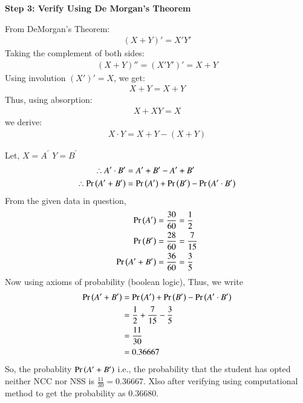 \documentclass[journal]{IEEEtran}
\begin{document}
\textbf{Step 3: Verify Using De Morgan’s Theorem}

From DeMorgan’s Theorem:
\begin{align}
(X + Y)' = X' Y'
\end{align}
Taking the complement of both sides:
\begin{align}
(X + Y)'' = (X' Y')' = X + Y
\end{align}
Using involution \( (X')' = X \), we get:
\begin{align}
X + Y = X + Y
\end{align}
Thus, using absorption:
\begin{align}
X + XY = X
\end{align}
we derive:
\begin{align}
X \cdot Y = X + Y - (X + Y)
\end{align}

Let, $X = A^\prime$ $Y = B^\prime $
\begin{align}
    \therefore  {A^\prime \cdot B^\prime} &= {A^\prime} + {B^\prime} - {A^\prime + B^\prime} \\
    \therefore  \Pr\left(A^\prime + B^\prime\right) &= \Pr\left(A^\prime\right) + \Pr\left(B^\prime\right) - \Pr\left(A^\prime \cdot B^\prime\right)
\end{align}
From the given data in question,
    \begin{align}
        \Pr\left(A^\prime\right) &= \frac{30}{60} = \frac{1}{2} \\
        \Pr\left(B^\prime\right) &= \frac{28}{60} = \frac{7}{15} \\
        \Pr\left(A^\prime + B^\prime\right) &= \frac{36}{60} = \frac{3}{5}    
    \end{align}
Now using axioms of probability (boolean logic),
Thus, we write
    \begin{align}
	    \Pr\left(A^\prime + B^\prime\right) &= \Pr\left(A^\prime\right) +  \Pr\left(B^\prime\right) - \Pr\left(A^\prime \cdot B^\prime\right) \\
	                                 &= \frac{1}{2} + \frac{7}{15} - \frac{3}{5} \\
	                                 &= \frac{11}{30} \\
	                                 &= 0.36667
    \end{align} 
\newpage
So, the probablity $\Pr\left(A^\prime + B^\prime\right)$ i.e., the probability that the student has opted neither NCC nor NSS is $\frac{11}{30} = 0.36667$.
Xlso after verifying using computational method to get the probability as 0.36680.
\end{document}
